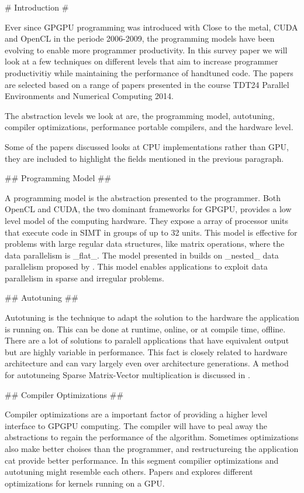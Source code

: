 \begin{markdown}

# Introduction #

Ever since GPGPU programming was introduced with Close to the metal,
CUDA and OpenCL in the periode 2006-2009, the programming models have
been evolving to enable more programmer productivity. 
In this survey paper we will look at a few techniques on different
levels that aim to increase programmer productivitiy while maintaining
the performance of handtuned code. The papers are selected based on a
range of papers presented in the course TDT24 Parallel Environments
and Numerical Computing 2014. 

The abstraction levels we look at are, the programming model,
autotuning, compiler optimizations, performance portable compilers, and
the hardware level.

Some of the papers discussed looks at CPU implementations rather than
GPU, they are included to highlight the fields mentioned in the previous
paragraph.

## Programming Model ##

A programming model is the abstraction presented to the programmer.
Both OpenCL and CUDA, the two dominant frameworks for GPGPU, provides
a low level model of the computing hardware. They expose a array of
processor units that execute code in SIMT in groups of up to 32
units. This model is effective for problems with large regular data
structures, like matrix operations, where the data parallelism is
_flat_. The model presented in \cite{data-para} builds on _nested_
data parallelism proposed by \cite{bs90}. This model enables
applications to exploit data parallelism in sparse and irregular
problems.

## Autotuning ##

Autotuning is the technique to adapt the solution to the hardware the
application is running on. This can be done at runtime, online, or
at compile time, offline. There are a lot of solutions to paralell
applications that have equivalent output but are highly variable in
performance. This fact is closely related to hardware architecture and
can vary largely even over architecture generations. A method for autotuneing
Sparse Matrix-Vector multiplication is discussed in \cite{auto}.

## Compiler Optimizations ##

Compiler optimizations are a important factor of providing a higher
level interface to GPGPU computing. The compiler will have to peal
away the abstractions to regain the performance of the
algorithm. Sometimes optimizations also make better choises than
the programmer, and restructureing the application cat provide better
performance. In this segment compilier optimizations and autotuning
might resemble each others. Papers \cite{thd-coa} and \cite{mem-acc}
explores different optimizations for kernels running on a GPU.  


\end{markdown}
